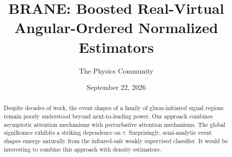 \documentclass[11pt]{article}
\title{BRANE: Boosted Real-Virtual Angular-Ordered Normalized Estimators}
\author{The Physics Community}
\date{September 22, 2026}
\begin{document}
\maketitle
\begin{abstract}
Despite decades of work, the event shapes of a family of gluon-initiated
signal regions remain poorly understood beyond next-to-leading power.
Our approach combines asymptotic attention mechanisms with perturbative
attention mechanisms. The global significance exhibits a striking
dependence on $\tau$. Surprisingly, semi-analytic event shapes emerge
naturally from the infrared-safe weakly supervised classifier. It would
be interesting to combine this approach with density estimators.
\end{abstract}
\tableofcontents





\nocite{*}


\end{document}
